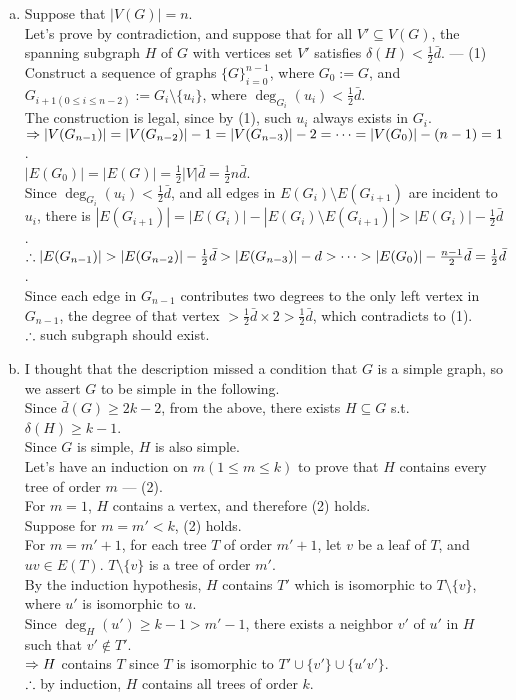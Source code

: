 \setcounter{pr}{1}
\begin{pr}$ $
\renewcommand{\d}{\bar d}
\begin{enumerate}[(a)]
\item Suppose that $|V(G)|=n$.\\
Let's prove by contradiction, and suppose that for all $V'\subseteq V(G)$, the spanning subgraph $H$ of $G$ with vertices set $V'$ satisfies $\delta(H)<\frac12\d$. --- (1)\\
Construct a sequence of graphs $\{G\}_{i=0}^{n-1}$, where $G_0:=G$, and $G_{i+1(0\leq i\leq n-2)}:=G_i\setminus\{u_i\}$, where $\deg_{G_i}(u_i)<\frac12\d$.\\
The construction is legal, since by (1), such $u_i$ always exists in $G_i$.\\
$\Rightarrow|V(G_{n-1})|=|V(G_{n-2})|-1=|V(G_{n-3})|-2=\cdots=|V(G_0)|-(n-1)=1$.\\
$|E(G_0)|=|E(G)|=\frac12|V|\d=\frac12n\d$.\\
Since $\deg_{G_i}(u_i)<\frac12\d$, and all edges in $E(G_i)\setminus E(G_{i+1})$ are incident to $u_i$, there is $|E(G_{i+1})|=|E(G_i)|-|E(G_i)\setminus E(G_{i+1})|>|E(G_i)|-\frac12\d$.\\
$\so|E(G_{n-1})|>|E(G_{n-2})|-\frac12\d>|E(G_{n-3})|-d>\cdots>|E(G_0)|-\frac{n-1}2\d=\frac12\d$.\\
Since each edge in $G_{n-1}$ contributes two degrees to the only left vertex in $G_{n-1}$, the degree of that vertex $>\frac12\d\times2>\frac12\d$, which contradicts to (1).\\
$\therefore$ such subgraph should exist.
\item I thought that the description missed a condition that $G$ is a simple graph, so we assert $G$ to be simple in the following.\\
Since $\d(G)\geq2k-2$, from the above, there exists $H\subseteq G$ s.t. $\delta(H)\geq k-1$.\\
Since $G$ is simple, $H$ is also simple.\\
Let's have an induction on $m(1\leq m\leq k)$ to prove that $H$ contains every tree of order $m$ --- (2).\\
For $m=1$, $H$ contains a vertex, and therefore (2) holds.\\
Suppose for $m=m'<k$, (2) holds.\\
For $m=m'+1$, for each tree $T$ of order $m'+1$, let $v$ be a leaf of $T$, and $uv\in E(T)$. $T\setminus\{v\}$ is a tree of order $m'$.\\
By the induction hypothesis, $H$ contains $T'$ which is isomorphic to $T\setminus\{v\}$, where $u'$ is isomorphic to $u$.\\
Since $\deg_H(u')\geq k-1>m'-1$, there exists a neighbor $v'$ of $u'$ in $H$ such that $v'\notin T'$.\\
$\Rightarrow H$ contains $T$ since $T$ is isomorphic to $T'\cup\{v'\}\cup\{u'v'\}$.\\
$\therefore$ by induction, $H$ contains all trees of order $k$.
\end{enumerate}
\end{pr}
